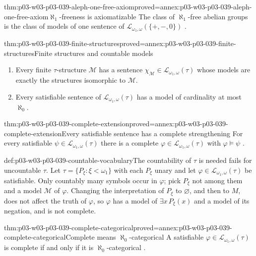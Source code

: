 \begin{hbtheorem}{thm:p03-w03-p03-039-aleph-one-free-axiom}{proved=annex:p03-w03-p03-039-aleph-one-free-axiom}{\(\aleph_1\)-freeness is axiomatizable}
The class of \(\aleph_1\)-free abelian groups is the class of models of one
sentence of \(\mathcal L_{\omega_1,\omega}(\{+,-,0\})\)
\cite[Ex.~2.24, p.~20]{Marker2014InfinitaryNotes}.
\end{hbtheorem}

\begin{hblemma}{thm:p03-w03-p03-039-finite-structures}{proved=annex:p03-w03-p03-039-finite-structures}{Finite structures and countable models}
\begin{enumerate}
\item Every finite \(\tau\)-structure \(\mathcal M\) has a sentence
      \(\chi_{\mathcal M}\in\mathcal L_{\omega_1,\omega}(\tau)\) whose models are
      exactly the structures isomorphic to \(\mathcal M\).
\item Every satisfiable sentence of \(\mathcal L_{\omega_1,\omega}(\tau)\) has
      a model of cardinality at most \(\aleph_0\).
\end{enumerate}
\end{hblemma}

\begin{hbtheorem}{thm:p03-w03-p03-039-complete-extension}{proved=annex:p03-w03-p03-039-complete-extension}{Every satisfiable sentence has a complete strengthening}
For every satisfiable \(\psi\in\mathcal L_{\omega_1,\omega}(\tau)\) there is a
complete \(\varphi\in\mathcal L_{\omega_1,\omega}(\tau)\) with
\(\varphi\models\psi\)
\cite[Ex.~2.27, p.~20]{Marker2014InfinitaryNotes}.
\end{hbtheorem}

\begin{hbwarning}{def:p03-w03-p03-039-countable-vocabulary}{The countability of \(\tau\) is needed}
 fails for uncountable
\(\tau\). Let \(\tau=\{P_\xi:\xi<\omega_1\}\) with each \(P_\xi\) unary and let
\(\varphi\in\mathcal L_{\omega_1,\omega}(\tau)\) be satisfiable. Only
countably many symbols occur in \(\varphi\); pick \(P_\xi\) not among them
and a model \(\mathcal M\) of \(\varphi\). Changing the interpretation of
\(P_\xi\) to \(\varnothing\), and then to \(M\), does not affect the truth of
\(\varphi\), so \(\varphi\) has a model of \(\exists x\,P_\xi(x)\) and a model of
its negation, and is not complete.
\end{hbwarning}

\begin{hbtheorem}{thm:p03-w03-p03-039-complete-categorical}{proved=annex:p03-w03-p03-039-complete-categorical}{Complete means \(\aleph_0\)-categorical}
A satisfiable \(\varphi\in\mathcal L_{\omega_1,\omega}(\tau)\) is complete if
and only if it is \(\aleph_0\)-categorical
\cite[Ex.~2.28, p.~20]{Marker2014InfinitaryNotes}.
\end{hbtheorem}

